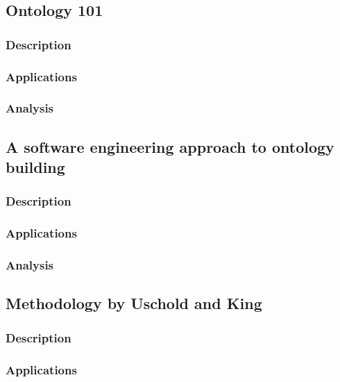 \subsection{Ontology 101}
\label{subsec:approach1}

\subsubsection{Description}

\subsubsection{Applications}

\subsubsection{Analysis}

\subsection{A software engineering approach to ontology building}
\label{subsec:approach2}

\subsubsection{Description}

\subsubsection{Applications}

\subsubsection{Analysis}

\subsection{Methodology by Uschold and King}
\label{subsec:approach3}

\subsubsection{Description}

\subsubsection{Applications}

